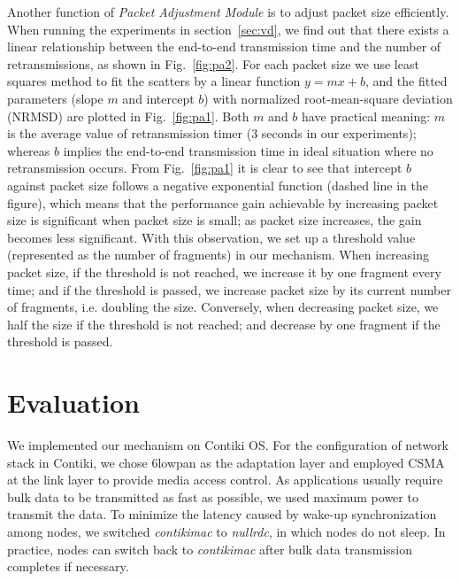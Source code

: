 \documentclass[runningheads,a4paper]{llncs}
\begin{document}
Another function of \emph{Packet Adjustment Module} is to adjust packet size efficiently. When running the experiments in section~\ref{sec:vd}, we find out that there exists a linear relationship between the end-to-end transmission time and the number of retransmissions, as shown in Fig.~\ref{fig:pa2}. For each packet size we use least squares method to fit the scatters by a linear function $y=mx+b$, and the fitted parameters (slope $m$ and intercept $b$) with normalized root-mean-square deviation (NRMSD) are plotted in Fig.~\ref{fig:pa1}. Both $m$ and $b$ have practical meaning: $m$ is the average value of retransmission timer (3 seconds in our experiments); whereas $b$ implies the end-to-end transmission time in ideal situation where no retransmission occurs. From Fig.~\ref{fig:pa1} it is clear to see that intercept $b$ against packet size follows a negative exponential function (dashed line in the figure), which means that the performance gain achievable by increasing packet size is significant when packet size is small; as packet size increases, the gain becomes less significant. With this observation, we set up a threshold value (represented as the number of fragments) in our mechanism. When increasing packet size, if the threshold is not reached, we increase it by one fragment every time; and if the threshold is passed, we increase packet size by its current number of fragments, i.e. doubling the size. Conversely, when decreasing packet size, we half the size if the threshold is not reached; and decrease by one fragment if the threshold is passed.

\section{Evaluation}
We implemented our mechanism on Contiki OS. For the configuration of network stack in Contiki, we chose 6lowpan as the adaptation layer and employed CSMA at the link layer to provide media access control. As applications usually require bulk data to be transmitted as fast as possible, we used maximum power to transmit the data. To minimize the latency caused by wake-up synchronization among nodes, we switched \textit{contikimac} to \textit{nullrdc}, in which nodes do not sleep. In practice, nodes can switch back to \textit{contikimac} after bulk data transmission completes if necessary.
\end{document}
